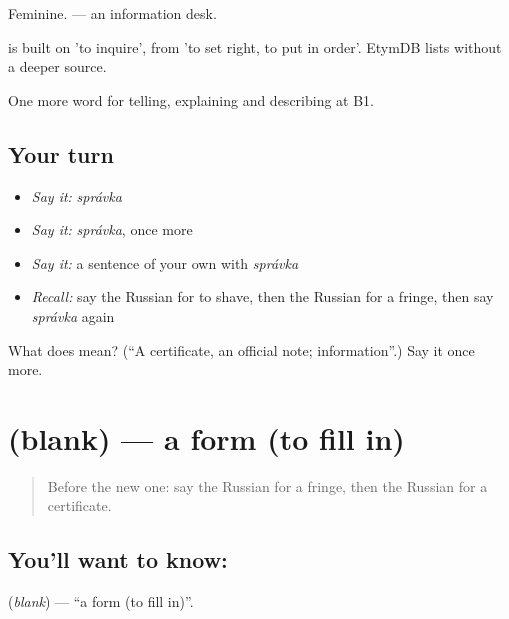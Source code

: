 Feminine. \emph{ } — an information desk.

\begin{cousinweb}
\emph{} is built on \emph{} 'to inquire', from \emph{} 'to set right, to put in order'. EtymDB lists \emph{} without a deeper source.
\end{cousinweb}

\begin{grammarlens}[title={What you've built}]
One more word for telling, explaining and describing at B1.
\end{grammarlens}

\subsection*{Your turn}
\begin{itemize}
\raggedright
  \item \emph{Say it:} \emph{správka}
  \item \emph{Say it:} \emph{správka}, once more
  \item \emph{Say it:} a sentence of your own with \emph{správka}
  \item \emph{Recall:} say the Russian for to shave, then the Russian for a fringe, then say \emph{správka} again
\end{itemize}

\begin{tcolorbox}[breakable,colback=teal!4,colframe=teal!35!black,title={Before you move on}]
What does  mean? (\textquotedblleft{}A certificate, an official note; information\textquotedblright{}.) Say it once more.
\end{tcolorbox}
\section[\texorpdfstring{\ru{бланк} (blank)}{бланк (blank)}]{ (blank) — a form (to fill in)}

\label{lesson:RU-C450-blank}



\begin{quote}
Before the new one: say the Russian for a fringe, then the Russian for a certificate.
\end{quote}

\subsection*{You'll want to know: }
\textbf{} (\emph{blank}) — \textquotedblleft{}a form (to fill in)\textquotedblright{}.

